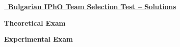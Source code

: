 \documentclass[12pt, a4paper]{article}
\theoremstyle{mystyle}
\newif\ifprob %
\begin{document}

\begin{Large}
	\ifprob
		\underline{\textbf{\the\yr\ Bulgarian IPhO Team Selection Test}}
	\else
		\underline{\textbf{\the\yr\ Bulgarian IPhO Team Selection Test -- Solutions}}
	\fi
\end{Large}

\vspace*{1cm}


% 
% 

\begin{large}
	\textbf{Theoretical Exam}
\end{large}




% 
% 
% 
% 
% 
% 
% 

\clearpage
\begin{large}
	\textbf{Experimental Exam}
\end{large}


% 


\end{document}
